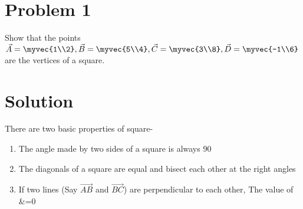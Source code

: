 \documentclass[journal,12pt,twocolumn]{IEEEtran}
\begin{document}
\section{Problem 1}
Show that the points $\vec {A}=\myvec {1\\2},
\vec {B}=\myvec {5\\4},
\vec {C}=\myvec {3\\8},
\vec {D}=\myvec {-1\\6}$ are the vertices of a square.
\section{Solution}
There are two basic properties of square-
\begin{lemma}
\begin{enumerate}


     \item  The angle made by two sides of a square is always 90\degree
     \item  The diagonals of a square are equal and bisect each other at the right angles
     \item  If two lines (Say {$\vec{AB}$} and {$\vec{BC}$}) are perpendicular to each   other, The value of &=0
     
\end{enumerate}
\end{lemma}
\end{document}
